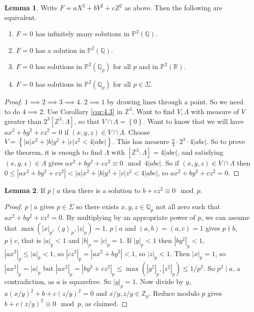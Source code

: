 \documentclass{article}
\newcommand{\Z}{\mathbb{Z}}
\newcommand{\Q}{\mathbb{Q}}
\newcommand{\R}{\mathbb{R}}
\renewcommand{\P}{\mathbb{P}}
\newcommand{\rb}[1]{\left( #1 \right)}
\renewcommand{\sb}[1]{\left[ #1 \right]}
\newcommand{\cb}[1]{\left\{ #1 \right\}}
\newcommand{\ab}[1]{\left\langle #1 \right\rangle}
\newcommand{\abs}[1]{\left\lvert #1 \right\rvert}
\theoremstyle{definition}\newtheorem{definition}{Definition}[section]
\theoremstyle{definition}\newtheorem{remark}[definition]{Remark}
\theoremstyle{definition}\newtheorem*{example}{Example}
\theoremstyle{definition}\newtheorem*{note}{Note}
\newtheorem{lemma}[definition]{Lemma}
\begin{document}
\begin{lemma}
Write $ F = aX^2 + bY^2 + cZ^2 $ as above. Then the following are equivalent.
\begin{enumerate}
\item $ F = 0 $ has infinitely many solutions in $ \P^2\rb{\Q} $.
\item $ F = 0 $ has a solution in $ \P^2\rb{\Q} $.
\item $ F = 0 $ has solutions in $ \P^2\rb{\Q_p} $ for all $ p $ and in $ \P^2\rb{\R} $.
\item $ F = 0 $ has solutions in $ \P^2\rb{\Q_p} $ for all $ p \in \Sigma $.
\end{enumerate}
\end{lemma}

\begin{proof}
$ 1 \implies 2 \implies 3 \implies 4 $. $ 2 \implies 1 $ by drawing lines through a point. So we need to do $ 4 \implies 2 $. Use Corollary \ref{cor:4.3} in $ \Z^3 $. Want to find $ V, \Lambda $ with measure of $ V $ greater than $ 2^3\sb{\Z^3 : \Lambda} $, so that $ V \cap \Lambda = \cb{0} $. Want to know that we will have $ ax^2 + by^2 + cz^2 = 0 $ if $ \rb{x, y, z} \in V \cap \Lambda $. Choose $ V = \cb{\abs{a}x^2 + \abs{b}y^2 + \abs{c}z^2 < 4\abs{abc}} $. This has measure $ \tfrac{\pi}{3} \cdot 2^3 \cdot 4\abs{abc} $. So to prove the theorem, it is enough to find $ \Lambda $ with $ \sb{\Z^3 : \Lambda} = 4\abs{abc} $, and satisfying $ \rb{x, y, z} \in \Lambda $ gives $ ax^2 + by^2 + cz^2 \equiv 0 \mod 4\abs{abc} $. So if $ \rb{x, y, z} \in V \cap \Lambda $ then $ 0 \le \abs{ax^2 + by^2 + cz^2} < \abs{a}x^2 + \abs{b}y^2 + \abs{c}z^2 < 4\abs{abc} $, so $ ax^2 + by^2 + cz^2 = 0 $.
\end{proof}


\begin{lemma}
If $ p \mid a $ then there is a solution to $ b + cz^2 \equiv 0 \mod p $.
\end{lemma}

\begin{proof}
$ p \mid a $ gives $ p \in \Sigma $ so there exists $ x, y, z \in \Q_p $ not all zero such that $ ax^2 + by^2 + cz^2 = 0 $. By multiplying by an appropriate power of $ p $, we can assume that $ \max\rb{\abs{x}_p, \ab{y}_p, \abs{z}_p} = 1 $. $ p \mid a $ and $ \rb{a, b} = \rb{a, c} = 1 $ gives $ p \nmid b $, $ p \nmid c $, that is $ \abs{a}_p < 1 $ and $ \abs{b}_p = \abs{c}_p = 1 $. If $ \abs{y}_p < 1 $ then $ \abs{by^2}_p < 1 $, $ \abs{ax^2}_p \le \abs{a}_p < 1 $, so $ \abs{cz^2}_p = \abs{ax^2 + by^2} < 1 $, so $ \abs{z}_p < 1 $. Then $ \abs{x}_p = 1 $, so $ \abs{ax^2}_p = \abs{a}_p $ but $ \abs{ax^2}_p = \abs{by^2 + cz^2}_p \le \max\rb{\abs{y^2}_p, \abs{z^2}_p} \le 1 / p^2 $. So $ p^2 \mid a $, a contradiction, as $ a $ is squarefree. So $ \abs{y}_p = 1 $. Now divide by $ y $, $ a\rb{x / y}^2 + b + c\rb{z / y}^2 = 0 $ and $ x / y, z / y \in \Z_p $. Reduce modulo $ p $ gives $ b + c\rb{z / y}^2 \equiv 0 \mod p $, as claimed.
\end{proof}
\end{document}
